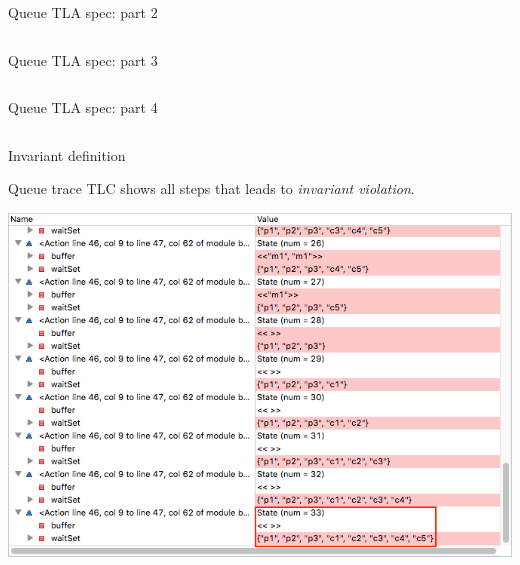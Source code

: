 \documentclass[12pt]{beamer}
\begin{document}
  \begin{frame}{Queue TLA spec: part 2}
      \begin{center}
          \inputminted[firstline=16,lastline=31,linenos,
            fontsize=\scriptsize]{tla}{figures/buffer.tla}
      \end{center}
  \end{frame}
  \begin{frame}{Queue TLA spec: part 3}
      \begin{center}
          \inputminted[firstline=32,lastline=42,linenos,
            fontsize=\scriptsize]{tla}{figures/buffer.tla}
      \end{center}
  \end{frame}
  \begin{frame}{Queue TLA spec: part 4}
      \begin{center}
          \inputminted[firstline=43,lastline=50,linenos,
            fontsize=\scriptsize]{tla}{figures/buffer.tla}
      \end{center}
      Invariant definition
  \end{frame}
  \begin{frame}{Queue trace}
      TLC shows all steps that leads to \textit{invariant violation}.
      \begin{center}
          \includegraphics[scale=0.42]{figures/buffer_trace}
      \end{center}
  \end{frame}
\end{document}
